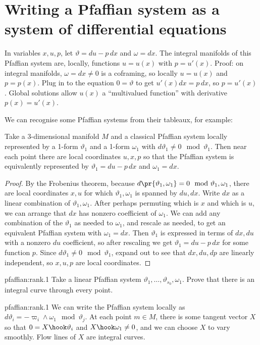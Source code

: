 \section{Writing a Pfaffian system as a system of differential equations}

\begin{example}
In variables \(x,u,p\), let \(\vartheta=du-p \, dx\) and \(\omega=dx\).
The integral manifolds of this Pfaffian system are, locally, functions \(u=u(x)\) with \(p=u'(x)\).
Proof: on integral manifolds, \(\omega=dx \ne 0\) is a coframing, so locally \(u=u(x)\) and \(p=p(x)\).
Plug in to the equation \(0=\vartheta\) to get \(u'(x)dx=p \, dx\), so \(p=u'(x)\).
Global solutions allow \(u(x)\) a ``multivalued function'' with derivative \(p(x)=u'(x)\).
\end{example}

We can recognise some Pfaffian systems from their tableaux, for example:
\begin{lemma}\label{lemma:contact.three}
Take a 3-dimensional manifold \(M\) and a classical Pfaffian system locally represented by a 1-form \(\vartheta_1\)  and a 1-form \(\omega_1\) with \(d\vartheta_1 \ne 0 \mod{\vartheta_1}\). 
Then near each point there are local coordinates \(u,x,p\) so that the Pfaffian system is equivalently represented by \(\vartheta_1=du-p \,dx\) and \(\omega_1=dx\).
\end{lemma}
\begin{proof}
By the Frobenius theorem, because \(d\pr{\vartheta_1,\omega_1}=0 \mod{\vartheta_1,\omega_1}\), there are local coordinates \(x,u\) for which \(\vartheta_1,\omega_1\) is spanned by \(du,dx\).
Write \(dx\) as a linear combination of \(\vartheta_1,\omega_1\).
After perhaps permuting which is \(x\) and which is \(u\), we can arrange that \(dx\) has nonzero coefficient of \(\omega_1\).
We can add any combination of the \(\vartheta_1\) as needed to \(\omega_1\), and rescale as needed, to get an equivalent Pfaffian system with \(\omega_1=dx\).
Then \(\vartheta_1\) is expressed in terms of \(dx, du\) with a nonzero \(du\) coefficient, so after rescaling we get \(\vartheta_1=du-p \, dx\) for some function \(p\).
Since \(d\vartheta_1 \ne 0 \mod{\vartheta_1}\),  expand out to see that \(dx, du, dp\) are linearly independent, so \(x, u, p\) are local coordinates.
\end{proof}


\begin{problem}{pfaffian:rank.1}
Take a linear Pfaffian system \(\vartheta_1,\dots,\vartheta_{s_0},\omega_1\).
Prove that there is an integral curve through every point.
\end{problem}
\begin{answer}{pfaffian:rank.1}
We can write the Pfaffian system locally as \(d\vartheta_i = - \varpi_i \wedge \omega_1 \mod{\vartheta_j}\).
At each point \(m \in M\), there is some tangent vector \(X\) so that \(0=X \hook \vartheta_i\) and \(X \hook \omega_1 \ne 0\), and we can choose \(X\) to vary smoothly.
Flow lines of \(X\) are integral curves.
\end{answer}



